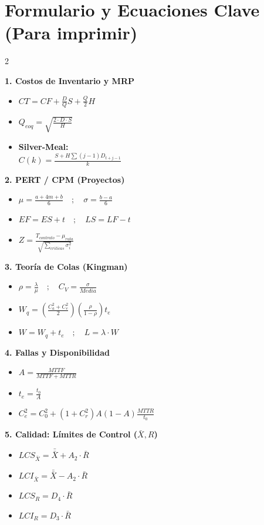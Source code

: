 \section{Formulario y Ecuaciones Clave (Para imprimir)}

\begin{multicols}{2}

\textbf{1. Costos de Inventario y MRP}
\begin{itemize}[leftmargin=*]
    \item $CT = CF + \frac{D}{Q}S + \frac{Q}{2}H$
    \item $Q_{eoq} = \sqrt{\frac{2 \cdot D \cdot S}{H}}$
    \item \textbf{Silver-Meal:} \\
    $C(k) = \frac{S + H \sum (j-1)D_{t+j-1}}{k}$
\end{itemize}

\textbf{2. PERT / CPM (Proyectos)}
\begin{itemize}[leftmargin=*]
    \item $\mu = \frac{a + 4m + b}{6} \quad ; \quad \sigma = \frac{b-a}{6}$
    \item $EF = ES + t \quad ; \quad LS = LF - t$
    \item $Z = \frac{T_{contrato} - \mu_{ruta}}{\sqrt{\sum_{criticas} \sigma_i^2}}$
\end{itemize}

\textbf{3. Teoría de Colas (Kingman)}
\begin{itemize}[leftmargin=*]
    \item $\rho = \frac{\lambda}{\mu} \quad ; \quad C_V = \frac{\sigma}{Media}$
    \item $W_q = \left( \frac{C_a^2 + C_e^2}{2} \right) \left( \frac{\rho}{1-\rho} \right) t_e$
    \item $W = W_q + t_e \quad ; \quad L = \lambda \cdot W$
\end{itemize}

\textbf{4. Fallas y Disponibilidad}
\begin{itemize}[leftmargin=*]
    \item $A = \frac{MTTF}{MTTF + MTTR}$
    \item $t_e = \frac{t_0}{A}$
    \item $C_e^2 = C_0^2 + (1 + C_r^2)A(1-A)\frac{MTTR}{t_0}$
\end{itemize}

\vfill\null
\columnbreak

\textbf{5. Calidad: Límites de Control ($\bar{X}, R$)}
\begin{itemize}[leftmargin=*]
    \item $LCS_{\bar{X}} = \bar{\bar{X}} + A_2 \cdot \bar{R}$
    \item $LCI_{\bar{X}} = \bar{\bar{X}} - A_2 \cdot \bar{R}$
    \item $LCS_R = D_4 \cdot \bar{R}$
    \item $LCI_R = D_3 \cdot \bar{R}$
\end{itemize}


\end{multicols}
